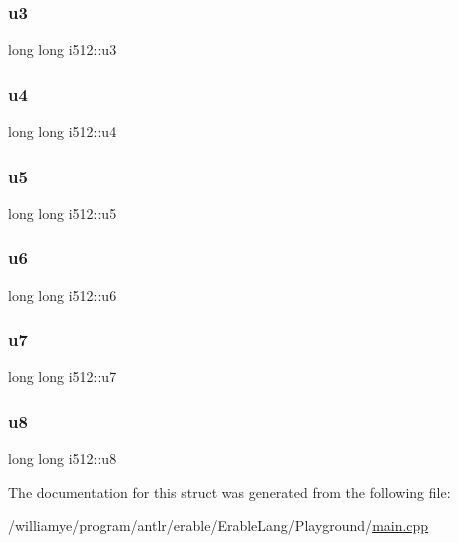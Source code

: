 \mbox{\label{structi512_a7b2ebbb360de90c668e274edd520692f}} 
\subsubsection{\texorpdfstring{u3}{u3}}
{\footnotesize\ttfamily long long i512\+::u3}

\mbox{\label{structi512_aa5e15e0dd53281ce868369aba3d581a0}} 
\subsubsection{\texorpdfstring{u4}{u4}}
{\footnotesize\ttfamily long long i512\+::u4}

\mbox{\label{structi512_a47d6f0745ab48fc750cd71ff7f4873a2}} 
\subsubsection{\texorpdfstring{u5}{u5}}
{\footnotesize\ttfamily long long i512\+::u5}

\mbox{\label{structi512_a5336030da073415dcec8917195b3df81}} 
\subsubsection{\texorpdfstring{u6}{u6}}
{\footnotesize\ttfamily long long i512\+::u6}

\mbox{\label{structi512_a0cbf737ca442e08cabd22c1a475213b9}} 
\subsubsection{\texorpdfstring{u7}{u7}}
{\footnotesize\ttfamily long long i512\+::u7}

\mbox{\label{structi512_a4cb0de0ed4509aa1789db1a5568580f6}} 
\subsubsection{\texorpdfstring{u8}{u8}}
{\footnotesize\ttfamily long long i512\+::u8}



The documentation for this struct was generated from the following file\+:\begin{DoxyCompactItemize}
\item 
/williamye/program/antlr/erable/\+Erable\+Lang/\+Playground/\mbox{\hyperlink{_playground_2main_8cpp}{main.\+cpp}}\end{DoxyCompactItemize}
